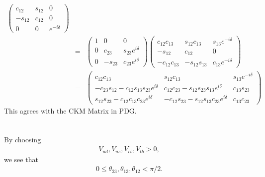 \documentclass[11pt]{article}
\begin{document}
\begin{eqnarray}
\begin{pmatrix}
        c_{12} & s_{12}& 0 \\
        -s_{12} &c_{12}&0\\
        0& 0& e^{-i\delta}
    \end{pmatrix}\\
    &=&
    \begin{pmatrix}
        1 & 0& 0 \\
        0 &c_{23}&s_{23}e^{i\delta}\\
        0& -s_{23}&c_{23}e^{i\delta}
    \end{pmatrix}
    \begin{pmatrix}
        c_{12}c_{13} & s_{12}c_{13}& s_{13}e^{-i\delta} \\
        -s_{12} &c_{12}& 0 \\
        -c_{12}c_{13}& -s_{12}s_{13}&c_{13}e^{-i\delta}
    \end{pmatrix}\\
    &=&
    \begin{pmatrix}
        c_{12}c_{13} & s_{12}c_{13} & s_{13}e^{-i\delta} \\
        -c_{23}s_{12}-c_{12}s_{13}s_{23}e^{i\delta} &c_{12}c_{23}-s_{12}s_{23}s_{13}e^{i\delta}& c_{13}s_{23} \\
        s_{12}s_{23}-c_{12}c_{13}c_{23}e^{i\delta}&-c_{12}s_{23}-s_{12}s_{13}c_{23}e^{i\delta}&c_{13}c_{23}
    \end{pmatrix}
  \end{eqnarray}
This agrees with the CKM Matrix in PDG.

\section{ }
By choosing
\begin{eqnarray}
    V_{ud}, V_{us}, V_{cb}, V_{tb} > 0,
\end{eqnarray}
  we see that 
  \begin{eqnarray}
    0 \le \theta_{23}, \theta_{13}, \theta_{12} < \pi/2.
  \end{eqnarray}
\end{document}
